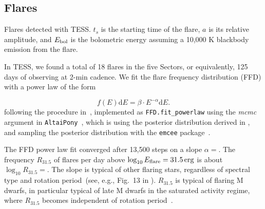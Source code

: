 \documentclass[twocolumn]{aastex631}
\begin{document}
\subsection{Flares}
\label{sec:res:flares}



\begin{table}
\centering
    \caption{Flares detected with TESS. $t_s$ is the starting time of the flare, $a$ is its relative amplitude, and $E_{\rm bol}$ is the bolometric energy assuming a 10,000 K blackbody emission from the flare.}
    
        \label{tab:flares}
\end{table}


In TESS, we found a total of 18 flares in the five Sectors, or equivalently, 125 days of observing at 2-min cadence. We fit the flare frequency distribution (FFD) with a power law of the form

\begin{equation}
    f(E) \mathrm{d} E = \beta \cdot E^{-\alpha} \mathrm{d} E.
\end{equation}
following the procedure in~\citep{ilin2021flares}, implemented as \texttt{FFD.fit\_powerlaw} using the \textit{mcmc} argument in \texttt{AltaiPony}~\citep{ilin2021altaipony}, which is using the posterior distribution derived in \citet{wheatland2004bayesian}, and sampling the posterior distribution with the \texttt{emcee} package~\citep{foreman-mackey2013emcee}.

The FFD power law fit converged after 13,500 steps on a slope $\alpha =$\ffdalpha\unskip. The frequency $R_{31.5}$ of flares per day above $\log_{10} E_{\rm flare} = 31.5\,\mathrm{erg}$ is about $\log_{10}R_{31.5}=$\ffdr\unskip. The slope is typical of other flaring stars, regardless of spectral type and rotation period~(see, e.g., Fig.~13 in \citealt{ilin2021flares}). $R_{31.5}$ is typical of flaring M dwarfs, in particular typical of late M dwarfs in the saturated activity regime, where $R_{31.5}$ becomes independent of rotation period~\citep{medina2020flare,murray2022study}. 
\end{document}
